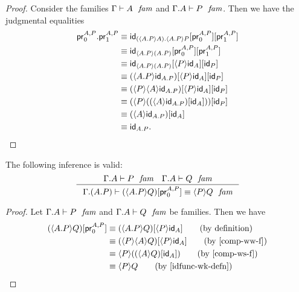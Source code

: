 \begin{proof}
Consider the families $\jfam{\Gamma}{A}$ and $\jfam{{\Gamma}{A}}{P}$. Then
we have the judgmental equalities
\begin{align*}
\ctxext{\cprojfstf{A}{P}}{\cprojsndf{A}{P}}
& \jdeq \subst{\cprojsndf{A}{P}}{{\cprojfstf{A}{P}}{\idfunc[\ctxext{\ctxwk{\ctxext{A}{P}}{A}}{\ctxwk{\ctxext{A}{P}}{P}}]}}\\
& \jdeq \subst{\cprojsndf{A}{P}}{{\cprojfstf{A}{P}}{\idfunc[\ctxwk{\ctxext{A}{P}}{\ctxext{A}{P}}]}}\\
& \jdeq \subst{\idfunc[P]}{{\ctxwk{P}{\idfunc[A]}}{\idfunc[\ctxwk{\ctxext{A}{P}}{\ctxext{A}{P}}]}}\\
& \jdeq \subst{\idfunc[P]}{{\ctxwk{P}{\idfunc[A]}}{\ctxwk{\ctxext{A}{P}}{\idfunc[\ctxext{A}{P}]}}}\\
& \jdeq \subst{\idfunc[P]}{{\ctxwk{P}{\idfunc[A]}}{\ctxwk{P}{{A}{\idfunc[\ctxext{A}{P}]}}}}\\
& \jdeq \subst{\idfunc[P]}{\ctxwk{P}{\subst{\idfunc[A]}{\ctxwk{A}{\idfunc[\ctxext{A}{P}]}}}}\\
& \jdeq \subst{\idfunc[A]}{\ctxwk{A}{\idfunc[\ctxext{A}{P}]}}\\
& \jdeq \idfunc[\ctxext{A}{P}].
\end{align*}
\end{proof}

\begin{lem}
The following inference is valid:
\begin{equation*}
\inference{\jfam{{\Gamma}{A}}{P}\quad\jfam{{\Gamma}{A}}{Q}}
{\jfameq{{\Gamma}{{A}{P}}}{\subst{\cprojfstf{A}{P}}{\ctxwk{\ctxext{A}{P}}{Q}}}{\ctxwk{P}{Q}}}
\end{equation*}
\end{lem}

\begin{proof}
Let $\jfam{{\Gamma}{A}}{P}$ and $\jfam{{\Gamma}{A}}{Q}$ be
families. Then we have
\begin{align*}
\subst{\cprojfstf{A}{P}}{\ctxwk{\ctxext{A}{P}}{Q}} 
& \jdeq \subst{\ctxwk{P}{\idfunc[A]}}{\ctxwk{\ctxext{A}{P}}{Q}} \tag{by definition}\\
& \jdeq \subst{\ctxwk{P}{\idfunc[A]}}{\ctxwk{P}{{A}{Q}}} \tag{by \autoref{comp-ww-f}}\\
& \jdeq \ctxwk{P}{\subst{\idfunc[A]}{\ctxwk{A}{Q}}} \tag{by \autoref{comp-ws-f}}\\
& \jdeq \ctxwk{P}{Q} \tag{by \autoref{idfunc-wk-defn}}
\end{align*}
\end{proof}

